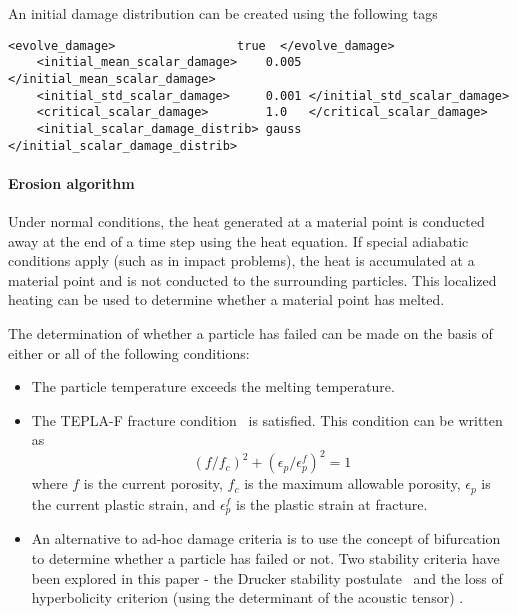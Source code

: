   An initial damage distribution can be created using the following tags
  \begin{Verbatim}[fontsize=\footnotesize]
    <evolve_damage>                 true  </evolve_damage>
    <initial_mean_scalar_damage>    0.005  </initial_mean_scalar_damage>
    <initial_std_scalar_damage>     0.001 </initial_std_scalar_damage>
    <critical_scalar_damage>        1.0   </critical_scalar_damage>
    <initial_scalar_damage_distrib> gauss </initial_scalar_damage_distrib>
  \end{Verbatim}

  \paragraph{Erosion algorithm}
  Under normal conditions, the heat generated at a material point is conducted
  away at the end of a time step using the heat equation.  If special adiabatic
  conditions apply (such as in impact problems), the heat is accumulated at a
  material point and is not conducted to the surrounding particles.  This
  localized heating can be used to determine whether a material point has
  melted.

  The determination of whether a particle has failed can be made on the
  basis of either or all of the following conditions:
  \begin{itemize}
    \item The particle temperature exceeds the melting temperature.
    \item The TEPLA-F fracture condition~\cite{Johnson88} is satisfied.
       This condition can be written as
       \begin{equation}
         (f/f_c)^2 + (\epsilon_p/\epsilon_p^f)^2 = 1
       \end{equation}
       where $f$ is the current porosity, $f_c$ is the maximum
       allowable porosity, $\epsilon_p$ is the current plastic strain, and
       $\epsilon_p^f$ is the plastic strain at fracture.
    \item An alternative to ad-hoc damage criteria is to use the concept of
       bifurcation to determine whether a particle has failed or not.  Two
       stability criteria have been explored in this paper - the Drucker
       stability postulate~\cite{Drucker59} and the loss of hyperbolicity
       criterion (using the determinant of the acoustic tensor)
       \cite{Rudnicki75,Perzyna98}.
  \end{itemize}

